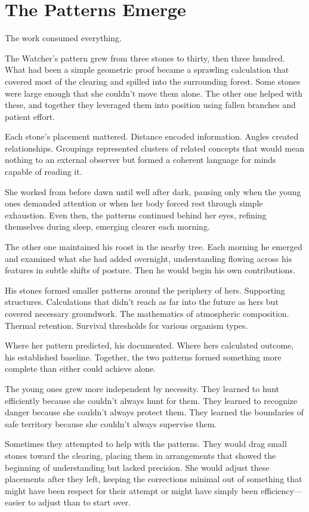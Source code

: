 \chapter{The Patterns Emerge}
\label{ch:05}


The work consumed everything.

The Watcher's pattern grew from three stones to thirty, then three hundred. What had been a simple geometric proof became a sprawling calculation that covered most of the clearing and spilled into the surrounding forest. Some stones were large enough that she couldn't move them alone. The other one helped with these, and together they leveraged them into position using fallen branches and patient effort.

Each stone's placement mattered. Distance encoded information. Angles created relationships. Groupings represented clusters of related concepts that would mean nothing to an external observer but formed a coherent language for minds capable of reading it.

She worked from before dawn until well after dark, pausing only when the young ones demanded attention or when her body forced rest through simple exhaustion. Even then, the patterns continued behind her eyes, refining themselves during sleep, emerging clearer each morning.

The other one maintained his roost in the nearby tree. Each morning he emerged and examined what she had added overnight, understanding flowing across his features in subtle shifts of posture. Then he would begin his own contributions.

His stones formed smaller patterns around the periphery of hers. Supporting structures. Calculations that didn't reach as far into the future as hers but covered necessary groundwork. The mathematics of atmospheric composition. Thermal retention. Survival thresholds for various organism types.

Where her pattern predicted, his documented. Where hers calculated outcome, his established baseline. Together, the two patterns formed something more complete than either could achieve alone.

The young ones grew more independent by necessity. They learned to hunt efficiently because she couldn't always hunt for them. They learned to recognize danger because she couldn't always protect them. They learned the boundaries of safe territory because she couldn't always supervise them.

Sometimes they attempted to help with the patterns. They would drag small stones toward the clearing, placing them in arrangements that showed the beginning of understanding but lacked precision. She would adjust these placements after they left, keeping the corrections minimal out of something that might have been respect for their attempt or might have simply been efficiency—easier to adjust than to start over.

